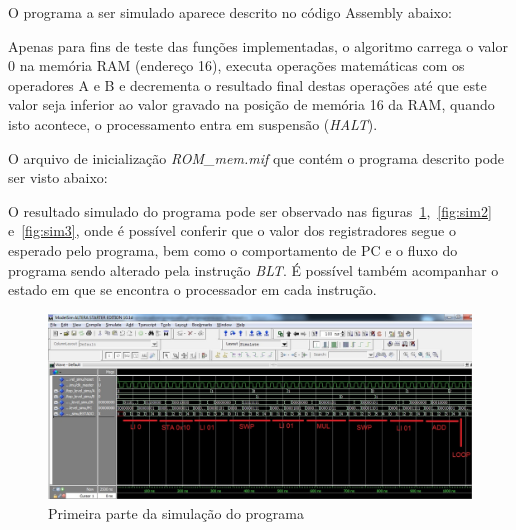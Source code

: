 \documentclass[../main.tex]{subfiles}
\begin{document}
    O programa a ser simulado aparece descrito no código Assembly abaixo:
	

	Apenas para fins de teste das funções implementadas, o algoritmo carrega o valor 0 na memória RAM (endereço 16), executa operações matemáticas
	com os operadores A e B e decrementa o resultado final destas operações até que este valor seja inferior ao valor gravado na posição de memória 16 da RAM,
	quando isto acontece, o processamento entra em suspensão (\textit{HALT}).
	
	O arquivo de inicialização \textit{ROM\_mem.mif} que contém o programa descrito pode ser visto abaixo:
	
	
	
	O resultado simulado do programa pode ser observado nas figuras~\ref{fig:sim1},~\ref{fig:sim2} e~\ref{fig:sim3},
	onde é possível conferir que o valor dos registradores segue o esperado pelo programa, bem como o comportamento de PC
	e o fluxo do programa sendo alterado pela instrução \textit{BLT}.
	É possível também acompanhar o estado em que se encontra o processador em cada instrução.
	
	\begin{figure}[h]
		\centering
		\includegraphics[width=\textwidth]{img/programa_p1}
		\caption{Primeira parte da simulação do programa}
		\label{fig:sim1}
	\end{figure}
		
\end{document}
